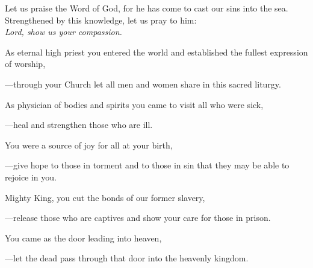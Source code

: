 \intercessions\indent

\begin{hangpar}

Let us praise the Word of God, for he has come to cast our sins into the sea. Strengthened by this knowledge, let us pray to him:\\
\emph{Lord, show us your compassion.}

\medskip As eternal high priest you entered the world and established the fullest expression of worship,

{\color{red}---\thinspace}through your Church let all men and women share in this sacred liturgy.

\medskip As physician of bodies and spirits you came to visit all who were sick,

{\color{red}---\thinspace}heal and strengthen those who are ill.

\medskip You were a source of joy for all at your birth,

{\color{red}---\thinspace}give hope to those in torment and to those in sin that they may be able to rejoice in you.

\medskip Mighty King, you cut the bonds of our former slavery,

{\color{red}---\thinspace}release those who are captives and show your care for those in prison.

\medskip You came as the door leading into heaven,

{\color{red}---\thinspace}let the dead pass through that door into the heavenly kingdom.

\medskip

\end{hangpar}